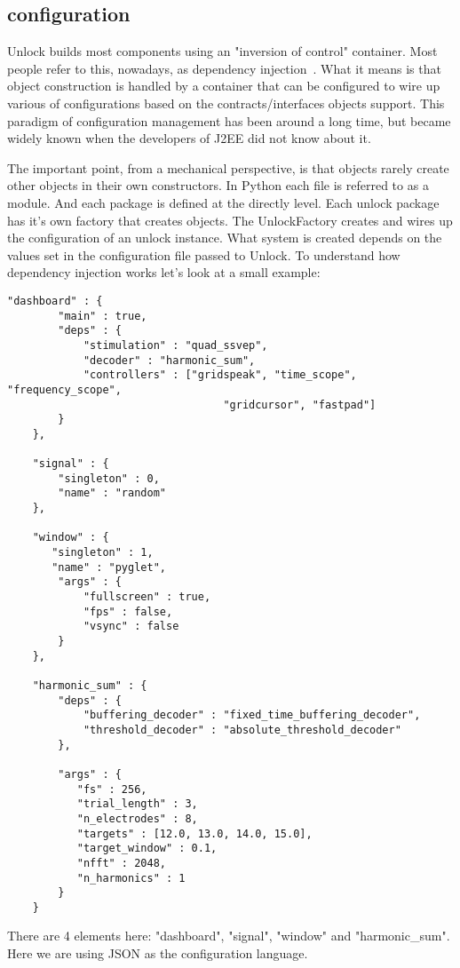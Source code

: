 \documentclass[11pt]{article}
\begin{document}
\subsection{configuration}
 Unlock builds most components using an "inversion of control" container.  Most people refer to this, nowadays, as dependency injection~\cite{depinjection}.  What it means is that object construction is handled by a container that can be configured to wire up various of configurations based on the contracts/interfaces objects support.  This paradigm of configuration management has been around a long time, but became widely known when the developers of J2EE did not know about it.

The important point, from a mechanical perspective, is that objects rarely create other objects in their own constructors.  In Python each file is referred to as a module.  And each package is defined at the directly level.  Each unlock package has it's own factory that creates objects.  The UnlockFactory creates and wires up the configuration of an unlock instance.  What system is created depends on the values set in the configuration file passed to Unlock.  To understand how dependency injection works let's look at a small example:
\begin{verbatim}
"dashboard" : {
        "main" : true,
        "deps" : {
            "stimulation" : "quad_ssvep",
            "decoder" : "harmonic_sum",
            "controllers" : ["gridspeak", "time_scope", "frequency_scope",
                                  "gridcursor", "fastpad"]
        }
    },
    
    "signal" : {
        "singleton" : 0,
        "name" : "random"
    },

    "window" : {
       "singleton" : 1,
       "name" : "pyglet",
        "args" : {
            "fullscreen" : true,
            "fps" : false,
            "vsync" : false
        }
    },
   
    "harmonic_sum" : {
        "deps" : {
            "buffering_decoder" : "fixed_time_buffering_decoder",
            "threshold_decoder" : "absolute_threshold_decoder"
        },
        
        "args" : {
           "fs" : 256,
           "trial_length" : 3,
           "n_electrodes" : 8,
           "targets" : [12.0, 13.0, 14.0, 15.0],
           "target_window" : 0.1,
           "nfft" : 2048,
           "n_harmonics" : 1
        }
    }
\end{verbatim}

There are 4 elements here: "dashboard",  "signal", "window" and "harmonic\_sum".  Here we are using JSON as the configuration language. 
\end{document}
